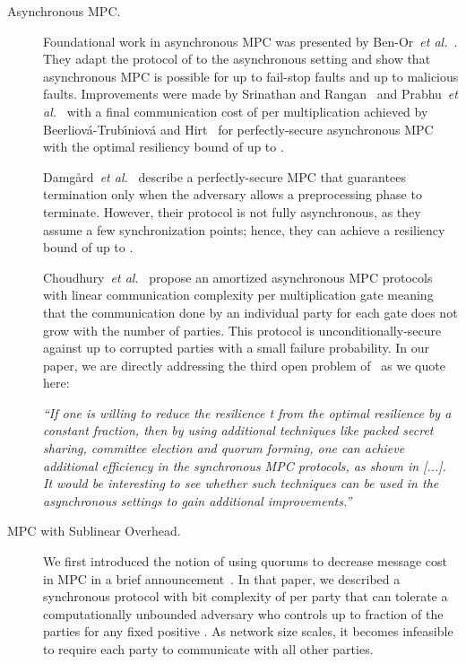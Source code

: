 \documentclass[11pt,letter]{article}
\newcommand{\etal}{\emph{et al.}}
\theoremstyle{mytheoremstyle}
\begin{document}
\begin{description}
	\item[Asynchronous MPC.]
	Foundational work in asynchronous MPC was presented by Ben-Or~\etal~\cite{benor_canetti_goldreich:asynchronous}. They adapt the protocol of \cite{bgw88} to the asynchronous setting and show that asynchronous MPC is possible for up to  fail-stop faults and up to  malicious faults. Improvements were made by Srinathan and Rangan~\cite{srinathan_pandu_rangan:efficient} and Prabhu~\etal~\cite{prabhu_srinathan_rangan:asynchronous} with a final
	communication cost of  per multiplication achieved by Beerliov\'{a}-Trub\'{\i}niov\'{a} and Hirt~\cite{Beerliova-Trubiniova:2007:SEP:1781454.1781486} for perfectly-secure asynchronous MPC with the optimal resiliency bound of up to .
	
	Damg{\aa}rd~\etal~\cite{Damgard:2009:AMC:1531954.1531967} describe a perfectly-secure MPC that guarantees termination only when the adversary allows a preprocessing phase to terminate. However, their protocol is not fully asynchronous, as they assume a few synchronization points; hence, they can achieve a resiliency bound of up to .
	
Choudhury~\etal~\cite{Choudhury:2013:AsyncMPC} propose an amortized asynchronous MPC protocols with linear communication complexity per multiplication gate meaning that the communication done by an individual party for each gate does not grow with the number of parties. This protocol is unconditionally-secure against up to  corrupted parties with a small failure probability. In our paper, we are directly addressing the third open problem of~\cite{Choudhury:2013:AsyncMPC} as we quote here: 
	
	\emph{``If one is willing to reduce the resilience t from the optimal resilience by a constant fraction, then by using additional techniques like packed secret sharing, committee election and quorum forming, one can achieve additional efficiency in the synchronous MPC protocols, as shown in [...]. It would be interesting to see whether such techniques can be used in the asynchronous settings to gain additional improvements.''}
	






	\item[MPC with Sublinear Overhead.]
	We first introduced the notion of using quorums to decrease message cost in MPC in a brief announcement~\cite{Dani:2012:BAB:2332432.2332473}. In that paper, we described a synchronous protocol with bit complexity of  per party that can tolerate a computationally unbounded adversary who controls up to  fraction of the parties for any fixed positive . As network size scales, it becomes infeasible to require each party to communicate with all other parties. 


\end{description}
\end{document}
